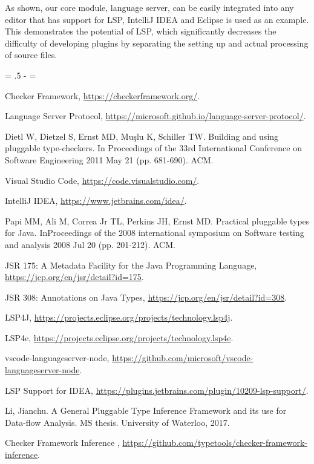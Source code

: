 \documentclass{article}
\newcommand{\ls}[1]
    {\dimen0=\fontdimen6\the\font\lineskip=#1\dimen0
     \advance\lineskip.5\fontdimen5\the\font
     \advance\lineskip-\dimen0
     \lineskiplimit=0.9\lineskip
     \baselineskip=\lineskip
     \advance\baselineskip\dimen0
     \normallineskip\lineskip\normallineskiplimit\lineskiplimit
     \normalbaselineskip\baselineskip
     \ignorespaces}
\begin{document}
As shown, our core module, language server, can be easily integrated into any editor that has support for LSP, IntelliJ IDEA and Eclipse is used as an example. This demonstrates the potential of LSP, which significantly decreases the difficulty of developing plugins by separating the setting up and actual processing of source files.



\ls{1.0}
\begin{thebibliography}{1}

 Checker Framework, \url{https://checkerframework.org/}.

 Language Server Protocol, \url{https://microsoft.github.io/language-server-protocol/}.

 Dietl W, Dietzel S, Ernst MD, Muşlu K, Schiller TW. Building and using pluggable type-checkers. In Proceedings of the 33rd International Conference on Software Engineering 2011 May 21 (pp. 681-690). ACM.

 Visual Studio Code, \url{https://code.visualstudio.com/}.

 IntelliJ IDEA, \url{https://www.jetbrains.com/idea/}.

 Papi MM, Ali M, Correa Jr TL, Perkins JH, Ernst MD. Practical pluggable types for Java. InProceedings of the 2008 international symposium on Software testing and analysis 2008 Jul 20 (pp. 201-212). ACM.

 JSR 175: A Metadata Facility for the Java Programming Language, \url{https://jcp.org/en/jsr/detail?id=175}.

 JSR 308: Annotations on Java Types, \url{https://jcp.org/en/jsr/detail?id=308}.

 LSP4J, \url{https://projects.eclipse.org/projects/technology.lsp4j}.

 LSP4e, \url{https://projects.eclipse.org/projects/technology.lsp4e}.

 vscode-languageserver-node, \url{https://github.com/microsoft/vscode-languageserver-node}.

 LSP Support for IDEA, \url{https://plugins.jetbrains.com/plugin/10209-lsp-support/}.

 Li, Jianchu. A General Pluggable Type Inference Framework and its use for Data-flow Analysis. MS thesis. University of Waterloo, 2017.

 Checker Framework Inference
, \url{https://github.com/typetools/checker-framework-inference}.

\end{thebibliography}
\end{document}
